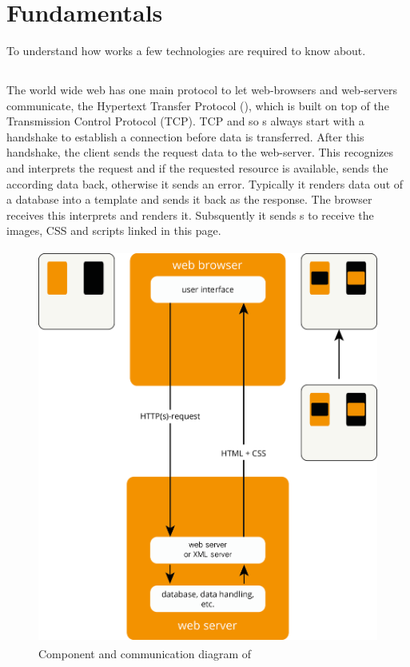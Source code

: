 \section{Fundamentals}

To understand how \lare{} works a few technologies are required to know about.

\subsection{\httpRequest{}\label{httpRequest}}
The world wide web has one main protocol to let web-browsers and web-servers communicate, the Hypertext Transfer Protocol (\http{}), which is built on top of the Transmission Control Protocol (TCP).
TCP and so \httpRequest{}s always start with a handshake to establish a connection before data is transferred.
After this handshake, the client sends the request data to the web-server.
This recognizes and interprets the request and if the requested resource is available, sends the according data back, otherwise it sends an error.
Typically it renders data out of a database into a \html{} template and sends it back as the response.
The browser receives this \webPage{} interprets and renders it.
Subsquently it sends \httpRequest{}s to receive the images, CSS and scripts linked in this page.
\begin{figure}[H]
\centering
\includegraphics[height=13cm]{images/http.png}
\caption[http_components]{Component and communication diagram of \http{}}
\label{fig:http_components}
\end{figure}

